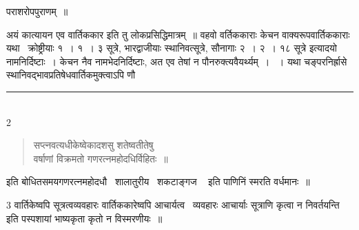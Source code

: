 \documentclass[11pt, openany]{book}
\begin{document}
\begin{multicols}{2}
\begin{flushright}
पराशरोपपुराणम्~॥
\end{flushright}

अयं कात्यायन एव वार्तिककार इति तु लोकप्रसिद्धिमात्रम्~॥ वहवो वर्तिककाराः केचन वाक्यरूपवार्तिककाराः यथा \textendash\ क्रोष्ट्रीयाः १~। १~। ३ सूत्रे, भारद्वाजीयाः स्थानिवत्सूत्रे, सौनागाः २~। २~। १८ सूत्रे इत्यादयो नामनिर्दिष्टाः~। केचन नैव नामभेदनिर्दिष्टाः, अत एव तेषां न पौनरुक्त्यवैयर्थ्यम्~। ~। यथा {\qt चङ्परनिर्ह्रासे स्थानिवद्भावप्रतिषेधवार्तिकमुक्त्वाऽपि }णौ \textendash\

\noindent
\rule{1\linewidth}{0.5pt}\\

2 \begin{quote}
{\qt सप्त्नवत्यधीकेष्वेकादशसु शतेष्वतीतेषु\\
वर्षाणां विक्रमतो गणरत्नमहोदधिर्विहितः~॥}
\end{quote}

इति बोधितसमयगणरत्नमहोदधौ \textendash\ {\qt शालातुरीय \textendash\ शकटाङ्गज \textendash\ } इति पाणिनिं स्मरति वर्धमानः~॥

3 वार्तिकेष्वपि सूत्रत्वव्यवहारः वार्तिककारेष्वपि आचार्यत्व \textendash\ व्यवहारः {\qt आचार्याः सूत्राणि कृत्वा न निवर्तयन्ति} इति पस्पशायां भाष्यकृता कृतो न विस्मरणीयः~॥
\end{multicols}

\newpage
\end{document}
